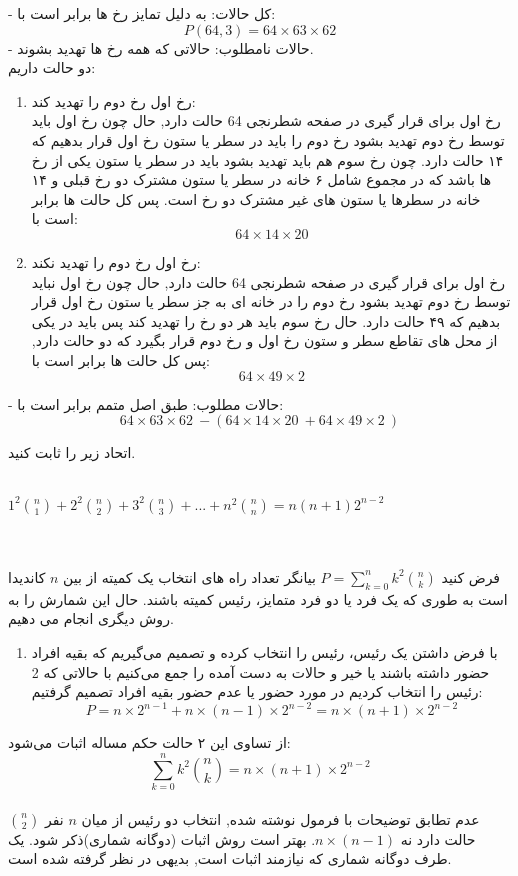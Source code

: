\documentclass[11pt,largemargins]{h2wp}
\begin{document}
   -  کل حالات: به دلیل تمایز رخ ها برابر است با:\\
        \[ P(64,3) = 64\times63\times62\]
      -  حالات نامطلوب: حالاتی که همه رخ ها تهدید بشوند.\\
      دو حالت داریم:
      \begin{enumerate}
\item
رخ اول رخ دوم را تهدید کند:\\
         رخ اول برای قرار گیری در صفحه شطرنجی 64 حالت دارد, حال چون رخ اول باید توسط رخ دوم تهدید بشود رخ دوم را باید در سطر یا ستون رخ اول قرار بدهیم که ۱۴ حالت دارد. چون رخ سوم هم باید تهدید بشود باید در سطر یا ستون یکی از رخ ها باشد که در مجموع شامل ۶ خانه در سطر یا ستون مشترک دو رخ قبلی و ۱۴ خانه در سطرها یا ستون های غیر مشترک دو رخ است. پس کل حالت ها برابر است با:\\
         \[64\times14\times20\]
\item
رخ اول رخ دوم را تهدید نکند:\\
         رخ اول برای قرار گیری در صفحه شطرنجی 64 حالت دارد, حال چون رخ اول نباید توسط رخ دوم تهدید بشود رخ دوم را در خانه ای به جز سطر یا ستون رخ اول قرار بدهیم که ۴۹ حالت دارد. حال رخ سوم باید هر دو رخ را تهدید کند پس باید در یکی از محل های تقاطع سطر و ستون رخ اول و رخ دوم قرار بگیرد که دو حالت دارد, پس کل حالت ها برابر است با:\\
         \[64\times49\times2\]
         
      \end{enumerate}
-         حالات مطلوب: طبق اصل متمم برابر است با:
         \[64\times63\times62\ - (64\times14\times20\ + 64\times49\times2\ )\]
  
       
\question
  اتحاد زیر را ثابت کنید.\\ \\
     \centerline{$1^2 {n \choose 1} + 2^2 {n \choose 2} + 3^2 {n \choose 3} + ... + n^2 {n \choose n} = n(n+1)2^{n-2}$}\\ \\
\solution
   فرض کنید $ P = \displaystyle\sum_{k=0}^{n} {{k^2}\binom{n}{k}}$ بیانگر تعداد راه های انتخاب یک کمیته از بین $n$ کاندیدا است به طوری که یک فرد یا دو فرد متمایز، رئیس کمیته باشند.  حال این شمارش را به روش دیگری انجام می دهیم.
    \begin{enumerate}
        \item 
        با فرض داشتن یک رئیس، رئیس را انتخاب کرده و تصمیم می‌گیریم که بقیه افراد حضور داشته باشند یا خیر و حالات به دست آمده را جمع می‌کنیم با حالاتی که 2 رئیس را انتخاب کردیم در مورد حضور یا عدم حضور بقیه افراد تصمیم گرفتیم:
        \[P = n\times{2^{n-1}} + n\times(n-1)\times{2^{n-2}} = n\times(n+1)\times{2^{n-2}}\]
    \end{enumerate}
    از تساوی این ۲ حالت حکم مساله اثبات می‌شود:
    \[\displaystyle\sum_{k=0}^{n} {{k^2}\binom{n}{k}} = n\times(n+1)\times{2^{n-2}}\]
    \\ 
\notes
{}
عدم تطابق توضیحات با فرمول نوشته شده, انتخاب دو رئیس از میان $n$ نفر $\binom{n}{2}$ حالت دارد نه $n\times(n-1)$. 
بهتر است روش اثبات (دوگانه شماری)ذکر شود.
یک طرف دوگانه شماری که نیازمند اثبات است, بدیهی در نظر گرفته شده است.
\end{document}
